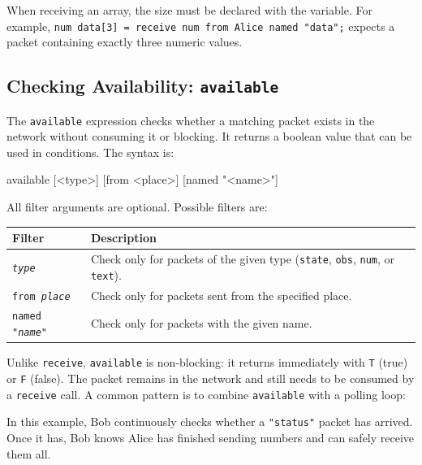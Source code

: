 When receiving an array, the size must be declared with the variable.
For example, \texttt{num data[3] = receive num from Alice named "data";}
expects a packet containing exactly three numeric values.

\subsection{Checking Availability: \texttt{available}}
\label{sec:available}

The \texttt{available} expression checks whether a matching packet exists in
the network without consuming it or blocking. It returns a boolean value that
can be used in conditions. The syntax is:

\begin{codebox}
available [<type>] [from <place>] [named "<name>"]
\end{codebox}

All filter arguments are optional. Possible filters are:

\begin{center}
\begin{tabular}{|l|p{9cm}|}
\hline
\textbf{Filter} & \textbf{Description} \\
\hline
\texttt{\textit{type}} &
    Check only for packets of the given type (\texttt{state}, \texttt{obs},
    \texttt{num}, or \texttt{text}). \\
\hline
\texttt{from \textit{place}} &
    Check only for packets sent from the specified place. \\
\hline
\texttt{named "\textit{name}"} &
    Check only for packets with the given name. \\
\hline
\end{tabular}
\end{center}

Unlike \texttt{receive}, \texttt{available} is non-blocking: it
returns immediately with \texttt{T} (true) or \texttt{F} (false). The packet
remains in the network and still needs to be consumed by a \texttt{receive}
call. A common pattern is to combine \texttt{available} with a polling loop:



In this example, Bob continuously checks whether a \texttt{"status"} packet
has arrived. Once it has, Bob knows Alice has finished sending numbers and
can safely receive them all.

